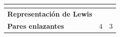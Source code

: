 \begin{exercise}
\begin{solu}
        \begin{center}
            \begin{tabular}{@{}L{3.6cm} C{4.6cm} C{4.6cm}@{}}
                \toprule
                 & \textbf{} & \textbf{} \\
                \midrule
                \textbf{Representación de Lewis} &  &  \\[3pt]
                \textbf{Pares enlazantes} & 4 & 3 \\[3pt]

\end{tabular}
\end{center}
\end{solu}
\end{exercise}
